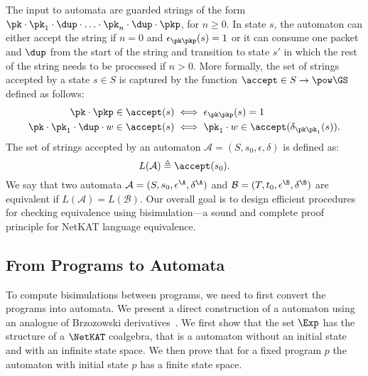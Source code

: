 The input to \NetKAT automata are guarded strings of the form $\pk
\cdot \pk_1 \cdot \dup \cdot \ldots \cdot \pk_n \cdot \dup \cdot
\pkp$, for $n\geq 0$. In state $s$, the automaton can either accept
the string if $n=0$ and $\epsilon_{\pk\pkp}(s)= 1$ or it can consume
one packet and $\dup$ from the start of the string and transition to
state $s'$ in which the rest of the string needs to be processed if $n
> 0$. More formally, the set of strings accepted by a state $s\in S$
is captured by the function $\accept\in S \to \pow\GS $ defined
as follows:
    \begin{align}
      \pk \cdot \pkp \in   \accept(s) &
      \iff \epsilon_{\pk\pkp}(s)=1 \\
 \label{accept_transition}
     \pk \cdot \pk_1 \cdot \dup \cdot w \in   \accept(s) &
     \iff
     \pk_1 \cdot w \in \accept(\delta_{\pk\pk_1}(s)).
    \end{align}
The set of strings accepted by an automaton $\mathcal A = (S, s_0,
\epsilon, \delta)$ is defined as:
%
\[
L(\mathcal{A}) \triangleq \accept(s_0).
\]
%
We say that two \NetKAT automata $\mathcal A= (S, s_0, \epsilon^\A,
\delta^\A)$ and $\mathcal B= (T, t_0, \epsilon^\B, \delta^\B)$ are
equivalent if $L(\mathcal{A}) = L(\mathcal{B})$. Our overall goal is
to design efficient procedures for checking equivalence using
bisimulation---a sound and complete proof principle for NetKAT
language equivalence.


\subsection{From \NetKAT Programs to Automata}
\label{automataconversion}

To compute bisimulations between \NetKAT programs, we need to first
convert the programs into automata. We present a direct construction
of a \NetKAT automaton using an analogue of Brzozowski
derivatives~\cite{brzozowski1962}. We first show that the set $\Exp$
has the structure of a $\NetKAT$ coalgebra, that is a \NetKAT
automaton without an initial state and with an infinite state
space. We then prove that for a fixed program $p$ the automaton with
initial state $p$ has a finite state space.


